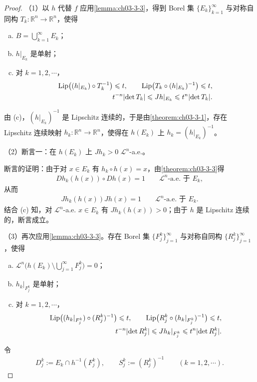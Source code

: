 \documentclass[../../main.tex]{subfiles}%
\begin{document}
\begin{proof}
（1）以 $h$ 代替 $f$ 应用\cref{lemma:ch03-3-3}，得到 Borel 集 $\{E_k\}_{k=1}^{\infty}$ 与对称自同构 $T_k:\mathbb{R}^n\to\mathbb{R}^n$，使得%
\begin{enumerate}[(a)]
\item $B=\bigcup_{k=1}^{\infty}E_k$；
\item $h|_{E_k}$ 是单射；
\item 对 $k=1,2,\cdots$，
\begin{align*}
\operatorname{Lip}\bigl((h|_{E_k})\circ T_k^{-1}\bigr)\leqslant t,\qquad\operatorname{Lip}\bigl(T_k\circ(h|_{E_k})^{-1}\bigr)\leqslant t,\\
t^{-n}\lvert\det T_k\rvert\leqslant Jh|_{E_k}\leqslant t^n\lvert\det T_k\rvert.
\end{align*}
\end{enumerate}
由 (c)，$(h|_{E_k})^{-1}$ 是 Lipschitz 连续的，于是由\cref{theorem:ch03-3-1}，存在 Lipschitz 连续映射 $h_k:\mathbb{R}^n\to\mathbb{R}^n$，使得在 $h(E_k)$ 上 $h_k=(h|_{E_k})^{-1}$。%

（2）断言一：在 $h(E_k)$ 上 $Jh_k>0$ $\mathcal{L}^n$-a.e.。

断言的证明：由于对 $x\in E_k$ 有 $h_k\circ h(x)=x$，由\cref{theorem:ch03-3-3}得%
\begin{align*}
Dh_k(h(x))\circ Dh(x)=1\qquad\mathcal{L}^n\text{-a.e. 于 }E_k,
\end{align*}
从而
\begin{align*}
Jh_k(h(x))Jh(x)=1\qquad\mathcal{L}^n\text{-a.e. 于 }E_k.
\end{align*}
结合 (c) 知，对 $\mathcal{L}^n$-a.e. $x\in E_k$ 有 $Jh_k(h(x))>0$；由于 $h$ 是 Lipschitz 连续的，断言成立。

（3）再次应用\cref{lemma:ch03-3-3}。存在 Borel 集 $\{F_j^k\}_{j=1}^{\infty}$ 与对称自同构 $\{R_j^k\}_{j=1}^{\infty}$，使得%
\begin{enumerate}[(d)]
\item $\mathcal{L}^n\bigl(h(E_k)\setminus\bigcup_{j=1}^{\infty}F_j^k\bigr)=0$；
\item $h_k|_{F_j^k}$ 是单射；
\item 对 $k=1,2,\cdots$，
\begin{align*}
\operatorname{Lip}\bigl((h_k|_{F_j^k})\circ(R_j^k)^{-1}\bigr)\leqslant t,\qquad\operatorname{Lip}\bigl(R_j^k\circ(h_k|_{F_j^k})^{-1}\bigr)\leqslant t,\\
t^{-n}\lvert\det R_j^k\rvert\leqslant Jh_k|_{F_j^k}\leqslant t^n\lvert\det R_j^k\rvert.
\end{align*}
\end{enumerate}
令
\begin{align*}
D_j^k:=E_k\cap h^{-1}(F_j^k),\qquad S_j^k:=(R_j^k)^{-1}\qquad(k=1,2,\cdots).
\end{align*}


\end{proof}
\end{document}
